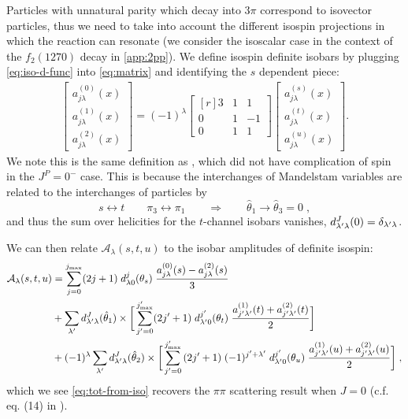 Particles with unnatural parity which decay into \(3\pi\) correspond to isovector particles, thus we need to take into account the different isospin projections in which the reaction can resonate (we consider the isoscalar case in the context of the \(f_2(1270)\) decay in \cref{app:2pp}).
We define isospin definite isobars by plugging \cref{eq:iso-d-func} into \cref{eq:matrix} and identifying the \(s\) dependent piece:
\begin{align}
  \begin{bmatrix}
  a^{(0)}_{j\lambda}(x) \\ a^{(1)}_{j\lambda}(x) \\ a^{(2)}_{j\lambda}(x)
  \end{bmatrix}
=
  (-1)^\lambda
  \begin{bmatrix*}[r]
    3 & 1 & 1 \\ 	0 & 1 & -1 \\ 0 & 1 & 1
  \end{bmatrix*}
  \begin{bmatrix}
  a^{(s)}_{j\lambda}(x) \\ a^{(t)}_{j\lambda}(x) \\ a^{(u)}_{j\lambda}(x)
  \end{bmatrix}.
\end{align}
We note this is the same definition as \cite{Albaladejo2018}, which did not have complication of spin in the \(J^P = 0^-\) case. This is because the interchanges of Mandelstam variables are related to the interchanges of particles by
  \begin{equation}
    \label{frame-change}
    s\leftrightarrow  t  \qquad \pi_3 \leftrightarrow \pi_1 \qquad \Rightarrow \qquad \hat{\theta}_1 \to \hat{\theta}_3 = 0 \; ,
  \end{equation}
and thus the sum over helicities for the \(t\)-channel isobars vanishes, \(d_{{\lambda^\prime} \lambda}^J(0) = \delta_{{\lambda^\prime}\lambda} \).

We can then relate \(\mathcal{A}_\lambda(s,t,u)\) to the isobar amplitudes of definite isospin:
  \begin{align}
    \label{eq:tot-from-iso}
    \mathcal{A}_\lambda(s,t,u) &= \sum_{j = 0}^{{j_\text{max}}} (2 j+1) \; d_{\lambda0}^j(\theta_s) \;
     \frac{a_{j \lambda}^{(0)}(s) - a_{j \lambda}^{(2)}(s)}{3}
     \nonumber \\
    &+ \sum_{\lambda^\prime}  d_{{\lambda^\prime} \lambda}^J(\hat{\theta}_1) \times
    \bigg[
    \sum_{{j^\prime} = 0}^{{j^\prime_\text{max}}} (2{j^\prime}+1) \; d_{{\lambda^\prime}0}^{j^\prime}(\theta_t) \;
    \frac{a_{{j^\prime} {\lambda^\prime}}^{(1)}(t) + a_{{j^\prime} {\lambda^\prime}}^{(2)}(t)}{2}
    \bigg] \\
   &+ (-1)^\lambda \sum_{{\lambda^\prime}}  d^{J}_{{\lambda^\prime}\lambda }(\hat{\theta}_2)
   \times
   \bigg[
   \sum_{{j^\prime} = 0}^{{j^\prime_\text{max}}} \, (2{j^\prime}+1) \; (-1)^{{j^\prime} + {\lambda^\prime}}
     \;d_{{\lambda^\prime}0}^{j^\prime}(\theta_u) \;
     \frac{a_{{j^\prime} {\lambda^\prime}}^{(1)}(u) + a_{{j^\prime} {\lambda^\prime}}^{(2)}(u)}{2}
   \bigg] \; ,
   \nonumber
   \end{align}
which we see \cref{eq:tot-from-iso} recovers the \(\pi\pi\) scattering result when \(J = 0\) (c.f. eq. (14) in \cite{Albaladejo2018}).

